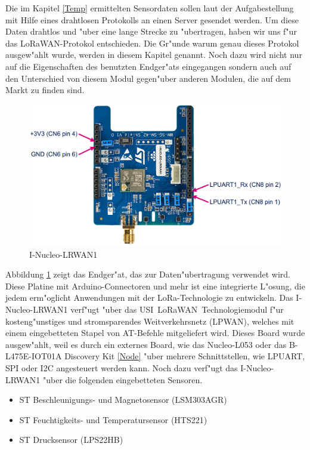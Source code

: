 Die im Kapitel \ref{Temp} ermittelten Sensordaten sollen laut der 
Aufgabestellung mit Hilfe eines drahtlosen Protokolls an einen Server 
gesendet werden. Um diese Daten drahtlos und "uber eine lange Strecke zu 
"ubertragen, haben wir uns f"ur das LoRaWAN-Protokol entschieden. Die 
Gr"unde warum genau dieses Protokol ausgew"ahlt wurde, werden in 
diesem Kapitel genannt. Noch dazu wird nicht nur auf die Eigenschaften 
des benutzten Endger"ats eingegangen sondern auch auf den Unterschied 
von diesem Modul gegen"uber anderen Modulen, die auf dem Markt zu 
finden sind.   
 
 
\begin{figure}[h]
	\centering
	\includegraphics[width=14cm]{source/images/LoRa_mod}
	\caption{I-Nucleo-LRWAN1 \cite{LoRaMod}\label{fig:loraMod}}
\end{figure}

Abbildung \ref{fig:loraMod} zeigt das Endger"at, das zur 
Daten"ubertragung verwendet wird. Diese Platine mit Arduino-Connectoren 
und mehr ist eine integrierte L"osung, die jedem erm"oglicht 
Anwendungen mit der LoRa-Technologie zu entwickeln. Das 
I-Nucleo-LRWAN1 verf"ugt "uber das USI\textregistered\ 
LoRaWAN\texttrademark\ Technologiemodul f"ur kosteng"unstiges und 
stromsparendes Weitverkehrsnetz (LPWAN), welches mit einem 
eingebetteten Stapel von AT-Befehle mitgeliefert wird.
Dieses Board wurde ausgew"ahlt, weil es durch ein 
externes Board, wie das Nucleo-L053 oder das B-L475E-IOT01A Discovery 
Kit \ref{Node} "uber mehrere Schnittstellen, wie \ac{LPUART}, \ac{SPI} 
oder I2C angesteuert werden kann. Noch dazu verf"ugt das 
I-Nucleo-LRWAN1 "uber die folgenden eingebetteten Sensoren.

\begin{itemize}
	\item ST Beschleunigungs- und Magnetosensor (LSM303AGR)
	\item ST Feuchtigkeits- und Temperatursensor (HTS221)
	\item ST Drucksensor (LPS22HB)
\end{itemize}

